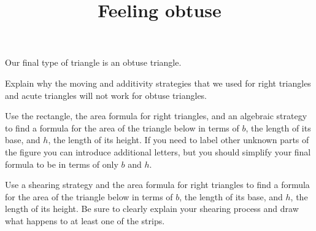 \documentclass[nooutcomes,noauthor]{ximera}
\title{Feeling obtuse}
\begin{document}
\begin{abstract}
\end{abstract}

\maketitle

Our final type of triangle is an obtuse triangle.

\begin{problem}
Explain why the moving and additivity strategies that we used for right triangles and acute triangles will not work for obtuse triangles. 

\begin{image}
\end{image}
\end{problem} \vfill

\begin{problem}
Use the rectangle, the area formula for right triangles, and an algebraic strategy to find a formula for the area of the triangle below in terms of $b$, the length of its base, and $h$, the length of its height. If you need to label other unknown parts of the figure you can introduce additional letters, but you should simplify your final formula to be in terms of only $b$ and $h$.

\begin{image}
\end{image}
\end{problem} \vfill

\newpage
\begin{problem}
Use a shearing strategy and the area formula for right triangles to find a formula for the area of the triangle below in terms of $b$, the length of its base, and $h$, the length of its height. Be sure to clearly explain your shearing process and draw what happens to at least one of the strips.

\begin{image}
\end{image}
\end{problem}
\end{document}
